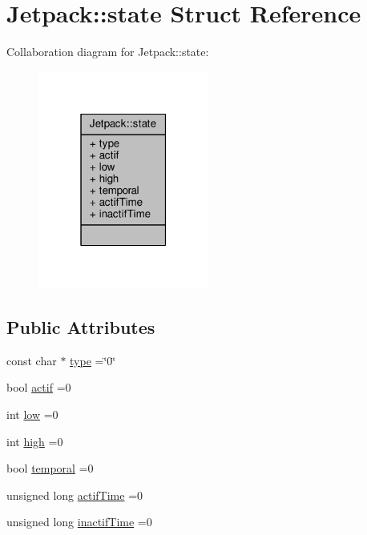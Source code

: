 \hypertarget{structJetpack_1_1state}{}\section{Jetpack\+:\+:state Struct Reference}
\label{structJetpack_1_1state}


Collaboration diagram for Jetpack\+:\+:state\+:
\nopagebreak
\begin{figure}[H]
\begin{center}
\leavevmode
\includegraphics[width=159pt]{structJetpack_1_1state__coll__graph}
\end{center}
\end{figure}
\subsection*{Public Attributes}
\begin{DoxyCompactItemize}
\item 
const char $\ast$ \hyperlink{structJetpack_1_1state_a59e307555493f5a64f87ac4c63943371}{type} =\char`\"{}0\char`\"{}
\item 
bool \hyperlink{structJetpack_1_1state_aa177541689bbaea21a4650a083b0df77}{actif} =0
\item 
int \hyperlink{structJetpack_1_1state_ace3ecd2b1f262756d8f7a8adda20136a}{low} =0
\item 
int \hyperlink{structJetpack_1_1state_a54cc9291c7cc30102a07fd2b0ccd8dde}{high} =0
\item 
bool \hyperlink{structJetpack_1_1state_abd6039e7a48856550b0ffbf8bcff7bdd}{temporal} =0
\item 
unsigned long \hyperlink{structJetpack_1_1state_af2e1cc323ef9ffcc3cf4d203f85d726b}{actif\+Time} =0
\item 
unsigned long \hyperlink{structJetpack_1_1state_aaf817b1f9e7a4d65b9e3ca4726b281f6}{inactif\+Time} =0
\end{DoxyCompactItemize}


